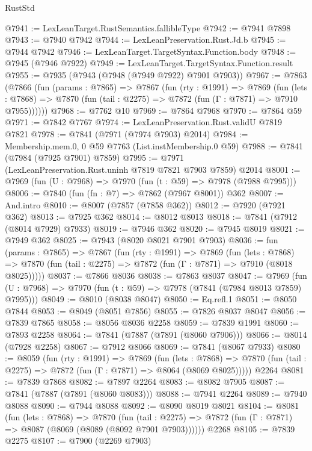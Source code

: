 \begin{lexlean}{RustStd}
\begin{coremodule}
{\begin{coremodule}
{{{{{{{{{{{{{{{{{{{{{{{{{{{{{{{{{{{{{{{{{{{{{{{{{{{{{{@7941 := LexLeanTarget.RustSemantics.fallibleType
@7942 := @7941 @7898
@7943 := @7940 @7942
@7944 := LexLeanPreservation.Rust.Jd.b
@7945 := @7944 @7942
@7946 := LexLeanTarget.TargetSyntax.Function.body
@7948 := @7945 (@7946 @7922)
@7949 := LexLeanTarget.TargetSyntax.Function.result
@7955 := @7935 (@7943 (@7948 (@7949 @7922) @7901 @7903))
@7967 := @7863
    (@7866
      (fun (params : @7865) =>
      @7867
        (fun (rty : @1991) =>
        @7869
          (fun (lets : @7868) =>
          @7870 (fun (tail : @2275) => @7872 (fun (Γ : @7871) => @7910 @7955))))))
@7968 := @7762 @10
@7969 := @7864 @7968
@7970 := @7864 @59
@7971 := @7842 @7767
@7974 := LexLeanPreservation.Rust.validU @7819 @7821
@7978 := @7841 (@7971 (@7974 @7903) @2014)
@7984 := Membership.mem.{0, 0} @59 @7763 (List.instMembership.{0} @59)
@7988 := @7841 (@7984 (@7925 @7901) @7859)
@7995 := @7971 (LexLeanPreservation.Rust.uninh @7819 @7821 @7903 @7859) @2014
@8001 := @7969 (fun (U : @7968) => @7970 (fun (t : @59) => @7978 (@7988 @7995)))
@8006 := @7840 (fun (fn : @7) => @7862 (@7967 @8001)) @362
@8007 := And.intro
@8010 := @8007 (@7857 (@7858 @362))
@8012 := @7920 (@7921 @362)
@8013 := @7925 @362
@8014 := @8012 @8013
@8018 := @7841 (@7912 (@8014 @7929) @7933)
@8019 := @7946 @362
@8020 := @7945 @8019
@8021 := @7949 @362
@8025 := @7943 (@8020 @8021 @7901 @7903)
@8036 := fun (params : @7865) =>
  @7867
    (fun (rty : @1991) =>
    @7869
      (fun (lets : @7868) =>
      @7870 (fun (tail : @2275) => @7872 (fun (Γ : @7871) => @7910 (@8018 @8025)))))
@8037 := @7866 @8036
@8038 := @7863 @8037
@8047 := @7969 (fun (U : @7968) => @7970 (fun (t : @59) => @7978 (@7841 (@7984 @8013 @7859) @7995)))
@8049 := @8010 (@8038 @8047)
@8050 := Eq.refl.{1}
@8051 := @8050 @7844
@8053 := @8049 (@8051 @7856)
@8055 := @7826 @8037 @8047
@8056 := @7839 @7865
@8058 := @8056 @8036 @2258
@8059 := @7839 @1991
@8060 := @7893 @2258
@8064 := @7841 (@7887 (@7891 (@8060 @7906)))
@8066 := @8014 (@7928 @2258)
@8067 := @7912 @8066
@8069 := @7841 (@8067 @7933)
@8080 := @8059
    (fun (rty : @1991) =>
    @7869
      (fun (lets : @7868) =>
      @7870 (fun (tail : @2275) => @7872 (fun (Γ : @7871) => @8064 (@8069 @8025)))))
    @2264
@8081 := @7839 @7868
@8082 := @7897 @2264
@8083 := @8082 @7905
@8087 := @7841 (@7887 (@7891 (@8060 @8083)))
@8088 := @7941 @2264
@8089 := @7940 @8088
@8090 := @7944 @8088
@8092 := @8090 @8019 @8021
@8104 := @8081
    (fun (lets : @7868) =>
    @7870
      (fun (tail : @2275) => @7872 (fun (Γ : @7871) => @8087 (@8069 (@8089 (@8092 @7901 @7903))))))
    @2268
@8105 := @7839 @2275
@8107 := @7900 (@2269 @7903)
}}}}}}}}}}}}}}}}}}}}}}}}}}}}}}}}}}}}}}}}}}}}}}}}}}}}}}
\end{coremodule}}
\end{coremodule}
\end{lexlean}
